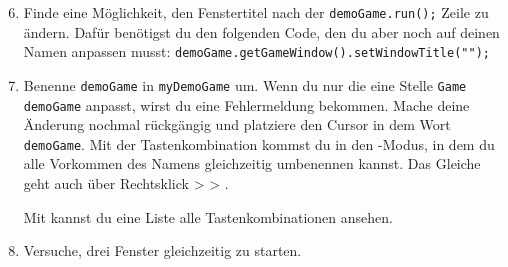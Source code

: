 \begin{enumerate} \setcounter{enumi}{5}
\item \optional Finde eine Möglichkeit, den Fenstertitel nach der \lstinline{demoGame.run();} Zeile zu ändern.
Dafür benötigst du den folgenden Code, den du aber noch auf deinen Namen anpassen musst: \lstinline{demoGame.getGameWindow().setWindowTitle("");}
\item \optional Benenne \lstinline{demoGame} in \lstinline{myDemoGame} um.
Wenn du nur die eine Stelle \lstinline{Game demoGame} anpasst, wirst du eine Fehlermeldung bekommen.
Mache deine Änderung nochmal rückgängig und platziere den Cursor in dem Wort \lstinline{demoGame}.
Mit der Tastenkombination  kommst du in den -Modus, in dem du alle Vorkommen des Namens gleichzeitig umbenennen kannst.
Das Gleiche geht auch über Rechtsklick >  > .

Mit  kannst du eine Liste alle Tastenkombinationen ansehen.
\item \optional Versuche, drei Fenster gleichzeitig zu starten.
\end{enumerate}
